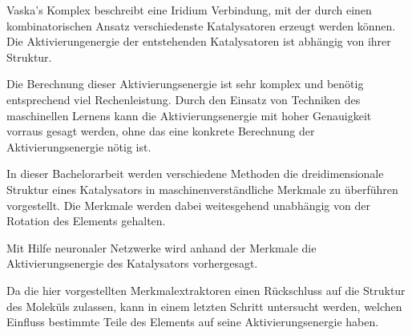 
\Abstract

Vaska's Komplex beschreibt eine Iridium Verbindung, mit der durch einen kombinatorischen Ansatz 
verschiedenste Katalysatoren erzeugt werden können.
Die Aktivierungenergie der entstehenden Katalysatoren ist abhängig von ihrer Struktur. 

Die Berechnung dieser Aktivierungsenergie ist sehr komplex und benötig entsprechend viel Rechenleistung.
Durch den Einsatz von Techniken des maschinellen Lernens kann die Aktivierungsenergie mit hoher Genauigkeit vorraus gesagt werden,
ohne das eine konkrete Berechnung der Aktivierungsenergie nötig ist.

In dieser Bachelorarbeit werden verschiedene Methoden die dreidimensionale Struktur 
eines Katalysators in maschinenverständliche Merkmale zu überführen vorgestellt. 
Die Merkmale werden dabei weitesgehend unabhängig von der Rotation des Elements gehalten.

Mit Hilfe neuronaler Netzwerke wird anhand der Merkmale die Aktivierungsenergie des Katalysators vorhergesagt.

Da die hier vorgestellten Merkmalextraktoren einen Rückschluss auf die Struktur des Moleküls zulassen, kann in einem letzten Schritt untersucht werden,
welchen Einfluss bestimmte Teile des Elements auf seine Aktivierungsenergie haben.


